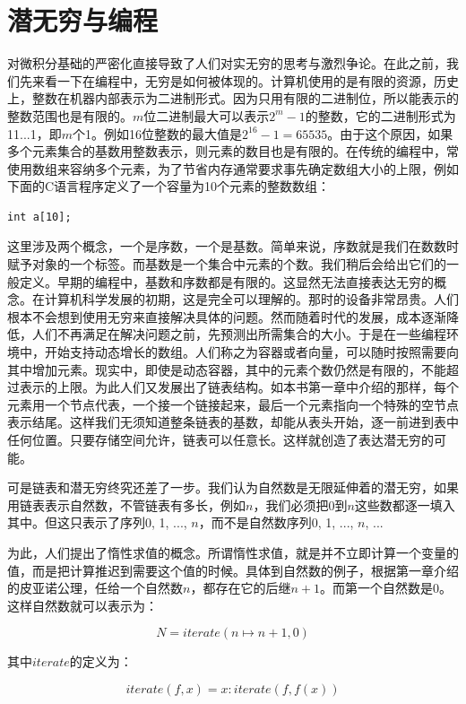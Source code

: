\documentclass{article}
\begin{document}
\section{潜无穷与编程}
对微积分基础的严密化直接导致了人们对实无穷的思考与激烈争论。在此之前，我们先来看一下在编程中，无穷是如何被体现的。计算机使用的是有限的资源，历史上，整数在机器内部表示为二进制形式。因为只用有限的二进制位，所以能表示的整数范围也是有限的。$m$位二进制最大可以表示$2^m-1$的整数，它的二进制形式为11...1，即$m$个1。例如16位整数的最大值是$2^{16}-1 = 65535$。由于这个原因，如果多个元素集合的基数用整数表示，则元素的数目也是有限的。在传统的编程中，常使用数组来容纳多个元素，为了节省内存通常要求事先确定数组大小的上限，例如下面的C语言程序定义了一个容量为10个元素的整数数组：

\begin{verbatim}
int a[10];
\end{verbatim}

这里涉及两个概念，一个是序数，一个是基数。简单来说，序数就是我们在数数时赋予对象的一个标签。而基数是一个集合中元素的个数。我们稍后会给出它们的一般定义。早期的编程中，基数和序数都是有限的。这显然无法直接表达无穷的概念。在计算机科学发展的初期，这是完全可以理解的。那时的设备非常昂贵。人们根本不会想到使用无穷来直接解决具体的问题。然而随着时代的发展，成本逐渐降低，人们不再满足在解决问题之前，先预测出所需集合的大小。于是在一些编程环境中，开始支持动态增长的数组。人们称之为容器或者向量，可以随时按照需要向其中增加元素。现实中，即使是动态容器，其中的元素个数仍然是有限的，不能超过表示的上限。为此人们又发展出了链表结构。如本书第一章中介绍的那样，每个元素用一个节点代表，一个接一个链接起来，最后一个元素指向一个特殊的空节点表示结尾。这样我们无须知道整条链表的基数，却能从表头开始，逐一前进到表中任何位置。只要存储空间允许，链表可以任意长。这样就创造了表达潜无穷的可能。

可是链表和潜无穷终究还差了一步。我们认为自然数是无限延伸着的潜无穷，如果用链表表示自然数，不管链表有多长，例如$n$，我们必须把0到$n$这些数都逐一填入其中。但这只表示了序列0, 1, ..., $n$，而不是自然数序列0, 1, ..., $n$, ...

为此，人们提出了惰性求值的概念。所谓惰性求值，就是并不立即计算一个变量的值，而是把计算推迟到需要这个值的时候。具体到自然数的例子，根据第一章介绍的皮亚诺公理，任给一个自然数$n$，都存在它的后继$n+1$。而第一个自然数是0。这样自然数就可以表示为：

\[
N = iterate(n \mapsto n + 1, 0)
\]

其中$iterate$的定义为：

\[
iterate(f, x) = x : iterate(f, f(x))
\]
\end{document}
